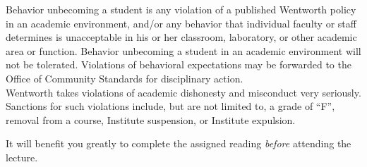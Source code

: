 \documentclass{wit_syllabus}
\begin{document}
\SyllabusAcademicSupport

\SyllabusAcademicHonesty


Behavior unbecoming a student is any violation of a published Wentworth policy in an academic environment, and/or any behavior that individual faculty or staff determines is unacceptable in his or her classroom, laboratory, or other academic area or function. 
Behavior unbecoming a student in an academic environment will not be tolerated. 
Violations of behavioral expectations may be forwarded to the Office of Community Standards for disciplinary action.
\\

Wentworth takes violations of academic dishonesty and misconduct very seriously. 
Sanctions for such violations include, but are not limited to, a grade of ``F'', removal from a course, Institute suspension, or Institute expulsion.

\SyllabusDisability

\SyllabusCOF


It will benefit you greatly to complete the assigned reading \textit{before} attending the lecture.
\\

\begin{SyllabusSchedule}
\end{SyllabusSchedule}
\end{document}
